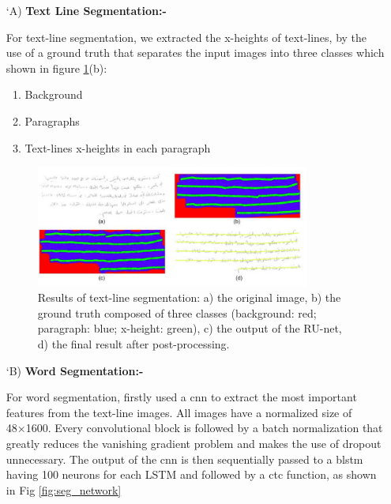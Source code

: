 \begin{itemize}[labelindent=1em,labelsep=0.25cm,leftmargin=*]
         \item[\char `A)] \textbf{Text Line Segmentation:-}
         
        For text-line segmentation, we extracted the x-heights of
        text-lines, by the use of a ground truth that separates the input images into three classes which shown in figure \ref{fig:result_of_line}(b):
        \begin{enumerate}
            \item Background
            \item Paragraphs
            \item Text-lines x-heights in each paragraph
        \end{enumerate}
        
        \begin{figure}[!htb]
            \centering
            \includegraphics[width=9cm]{images/result_of_line.png}
            \caption{Results of text-line segmentation: a) the original image, b) the ground truth composed of three classes (background: red; paragraph: blue; x-height: green), c) the output of the RU-net, d) the final result after post-processing.}
            \label{fig:result_of_line}
        \end{figure}
        
        \item[\char `B)] \textbf{Word Segmentation:-}
        
        For word segmentation, firstly used a \acrshort{cnn} to extract the most important features from the text-line images. All images have a normalized size of 48×1600. Every convolutional block is followed by a batch normalization that greatly reduces the vanishing gradient problem and makes the use of dropout unnecessary. The output of the \acrshort{cnn} is then sequentially passed to a \acrshort{blstm} having 100 neurons for each LSTM and followed by a \acrshort{ctc} function, as shown in Fig \ref{fig:seg_network}
        

\end{itemize}
